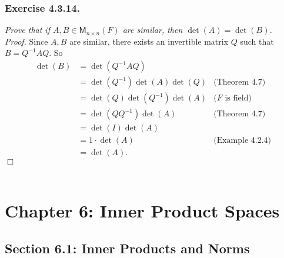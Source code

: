 \documentclass{article}
\begin{document}



\subsubsection*{Exercise 4.3.14.}
\emph{Prove that if $A, B \in \mathsf{M}_{n \times n}(F)$
are similar, then $\det(A) = \det(B)$.} \\

\emph{Proof.}
Since $A, B$ are similar, there exists an invertible matrix $Q$
such that $B = Q^{-1}AQ$.
So
\begin{align*}
\det(B)
&= \det(Q^{-1}AQ) \\
&= \det(Q^{-1})\det(A)\det(Q)
  &\text{(Theorem 4.7)} \\
&= \det(Q)\det(Q^{-1})\det(A)
  &\text{($F$ is field)} \\
&= \det(Q Q^{-1})\det(A)
  &\text{(Theorem 4.7)} \\
&= \det(I)\det(A) \\
&= 1 \cdot \det(A)
  &\text{(Example 4.2.4)} \\
&= \det(A).
\end{align*}
$\Box$ \\\\






\newpage
\section*{Chapter 6: Inner Product Spaces \\}



\subsection*{Section 6.1: Inner Products and Norms \\}
\end{document}
